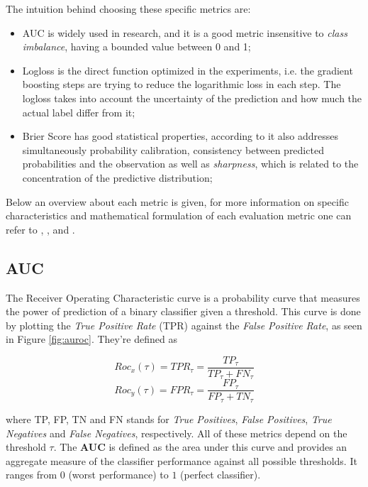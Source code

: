 The intuition behind choosing these specific metrics are:

\begin{itemize}
    \item AUC is widely used in research, and it is a good metric insensitive to \textit{class imbalance}, having a bounded value between 0 and 1;
    \item Logloss is the direct function optimized in the experiments, i.e. the gradient boosting steps are trying to reduce the logarithmic loss in each step. The logloss takes into account the uncertainty of the prediction and how much the actual label differ from it;
    \item Brier Score has good statistical properties, according to \cite{rufibach2010use} it also addresses simultaneously probability calibration, consistency between predicted probabilities and the observation as well as \textit{sharpness}, which is related to the concentration of the predictive distribution;
\end{itemize}

Below an overview about each metric is given, for more information on specific characteristics and mathematical formulation of each evaluation metric one can refer to \cite{BROWN200624}, \cite{rufibach2010use}, \cite{kuhn2013applied} and \cite{hastie2009elements}.

\subsection{AUC}

The Receiver Operating Characteristic curve is a probability curve that measures the power of prediction of a binary classifier given a threshold. This curve is done by plotting the \textit{True Positive Rate} (TPR) against the \textit{False Positive Rate}, as seen in Figure \ref{fig:auroc}. They're defined as

$$Roc_x(\tau) = TPR_{\tau} = \frac{TP_{\tau}}{TP_{\tau} + FN_{\tau}}$$
$$Roc_y(\tau) = FPR_{\tau} = \frac{FP_{\tau}}{FP_{\tau} + TN_{\tau}}$$

where TP, FP, TN and FN stands for \textit{True Positives}, \textit{False Positives}, \textit{True Negatives} and \textit{False Negatives}, respectively. All of these metrics depend on the threshold $\tau$. The \textbf{AUC} is defined as the area under this curve and provides an aggregate measure of the classifier performance against all possible thresholds. It ranges from $0$ (worst performance) to $1$ (perfect classifier).

